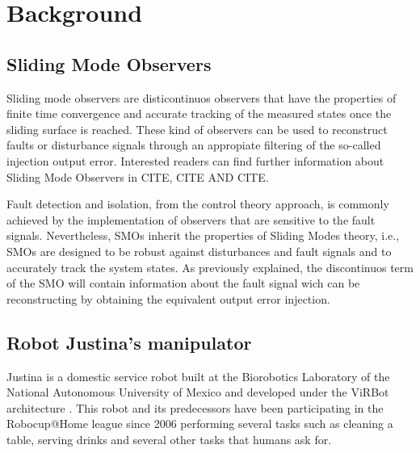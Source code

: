 \documentclass[a4paper, 10pt]{article}
\begin{document}
\section{Background}
\subsection{Sliding Mode Observers}
Sliding mode observers are disticontinuos observers that have the properties of finite time convergence and accurate tracking of the measured states once the sliding surface is reached. These kind of observers can be used to reconstruct faults or disturbance signals through an appropiate filtering of the so-called injection output error. Interested readers can find further information about Sliding Mode Observers in CITE, CITE AND CITE.

Fault detection and isolation, from the control theory approach, is commonly achieved by the implementation of observers that are sensitive to the fault signals. Nevertheless, SMOs inherit the properties of Sliding Modes theory, i.e., SMOs are designed to be robust against disturbances and fault signals and to accurately track the system states. As previously explained, the discontinuos term of the SMO will contain information about the fault signal wich can be reconstructing by obtaining the equivalent output error injection. 

\subsection{Robot Justina's manipulator}
Justina is a domestic service robot built at the Biorobotics Laboratory of the National Autonomous University of Mexico and developed under the ViRBot architecture \cite{savage2008virbot}. This robot and its predecessors have been participating in the Robocup@Home league \cite{wachsmuth2015robocup} since 2006 performing several tasks such as cleaning a table, serving drinks and several other tasks that humans ask for. 
\end{document}
